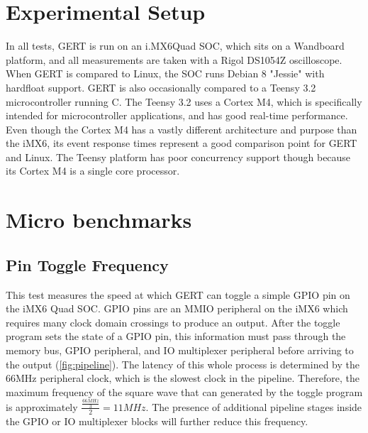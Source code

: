 \section{Experimental Setup} \label{sec:setup}
In all tests, GERT is run on an i.MX6Quad SOC, which sits on a Wandboard
platform, and all measurements are taken
with a Rigol DS1054Z oscilloscope. When GERT is compared to Linux, the SOC
runs Debian 8 "Jessie" with hardfloat support. GERT is also occasionally
compared to a Teensy 3.2 microcontroller running C. The Teensy 3.2 uses a Cortex M4, which is specifically
intended for microcontroller applications, and has good real-time performance. Even though
the Cortex M4 has a vastly different architecture and purpose than the iMX6, its event
response times represent a good comparison point for GERT and Linux.
The Teensy platform
has poor concurrency support though because its Cortex M4 is a single core processor.



\section{Micro benchmarks}

\subsection{Pin Toggle Frequency}\label{sec:pin_toggle}
This test measures the speed at which GERT can toggle a simple GPIO pin on
the iMX6 Quad SOC. GPIO pins are an MMIO peripheral on the iMX6 which requires
many clock domain crossings to produce an output. After the toggle program sets
the state of a GPIO pin, this information must pass through the memory bus,
GPIO peripheral, and IO multiplexer peripheral before arriving to the output (\ref{fig:pipeline}).
The latency of this whole process is determined by the 66MHz peripheral clock,
which is the slowest clock in the pipeline. Therefore, the maximum frequency
of the square wave that can generated by the toggle program is approximately $\frac{\frac{66MHz}{3}}{2}=11MHz$. The presence
of additional pipeline stages inside the GPIO or IO multiplexer blocks will further
reduce this frequency.

